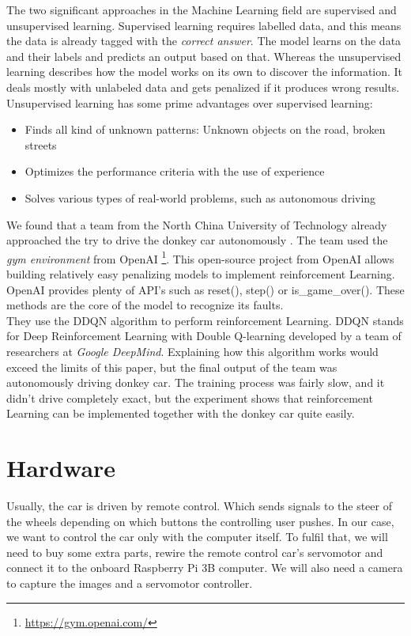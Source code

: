 \documentclass[journal]{IEEEtran}
\begin{document}
The two significant approaches in the Machine Learning field are supervised and unsupervised learning. Supervised learning requires labelled data, and this means the data is already tagged with the \textit{correct answer}. The model learns on the data and their labels and predicts an output based on that. Whereas the unsupervised learning describes how the model works on its own to discover the information. It deals mostly with unlabeled data and gets penalized if it produces wrong results. Unsupervised learning has some prime advantages over supervised learning:

\begin{itemize}
\item Finds all kind of unknown patterns: Unknown objects on the road, broken streets
\item Optimizes the performance criteria with the use of experience
\item Solves various types of real-world problems, such as autonomous driving
\end{itemize}

We found that a team from the North China University of Technology already approached the try to drive the donkey car autonomously \cite{reinforcement}. The team used the \textit{gym environment} from OpenAI \footnote{\url{https://gym.openai.com/}}. This open-source project from OpenAI allows building relatively easy penalizing models to implement reinforcement Learning. OpenAI provides plenty of API's such as reset(), step() or is\_game\_over(). These methods are the core of the model to recognize its faults. \\
They use the DDQN algorithm to perform reinforcement Learning. DDQN stands for Deep Reinforcement Learning with Double Q-learning \cite{reinforcement2} developed by a team of researchers at \textit{Google DeepMind}. Explaining how this algorithm works would exceed the limits of this paper, but the final output of the team \cite{reinforcement} was autonomously driving donkey car. The training process was fairly slow, and it didn't drive completely exact, but the experiment shows that reinforcement Learning can be implemented together with the donkey car quite easily.
\section{Hardware}
Usually, the car is driven by remote control. Which sends signals to the steer of the wheels depending on which buttons the controlling user pushes. In our case, we want to control the car only with the computer itself. To fulfil that, we will need to buy some extra parts, rewire the remote control car’s servomotor and connect it to the onboard Raspberry Pi 3B computer. We will also need a camera to capture the images and a servomotor controller.
\end{document}
